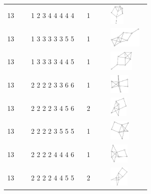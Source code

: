\begin{table}[h!]
\begin{tabular}{m{0.15\linewidth} m{0.35\linewidth} m{0.15\linewidth} m{0.25\linewidth}}
13 & 1 2 3 4 4 4 4 4 & 1 & \includegraphics[height=1cm]{15-universal-graphs/img/degree-sequences-example-graphs/graph-4-8-47}\\
13 & 1 3 3 3 3 3 5 5 & 1 & \includegraphics[height=1cm]{15-universal-graphs/img/degree-sequences-example-graphs/graph-4-8-48}\\
13 & 1 3 3 3 3 4 4 5 & 1 & \includegraphics[height=1cm]{15-universal-graphs/img/degree-sequences-example-graphs/graph-4-8-49}\\
13 & 2 2 2 2 3 3 6 6 & 1 & \includegraphics[height=1cm]{15-universal-graphs/img/degree-sequences-example-graphs/graph-4-8-50}\\
13 & 2 2 2 2 3 4 5 6 & 2 & \includegraphics[height=1cm]{15-universal-graphs/img/degree-sequences-example-graphs/graph-4-8-51}\\
13 & 2 2 2 2 3 5 5 5 & 1 & \includegraphics[height=1cm]{15-universal-graphs/img/degree-sequences-example-graphs/graph-4-8-52}\\
13 & 2 2 2 2 4 4 4 6 & 1 & \includegraphics[height=1cm]{15-universal-graphs/img/degree-sequences-example-graphs/graph-4-8-53}\\
13 & 2 2 2 2 4 4 5 5 & 2 & \includegraphics[height=1cm]{15-universal-graphs/img/degree-sequences-example-graphs/graph-4-8-54}\\

\end{tabular}
\end{table}

